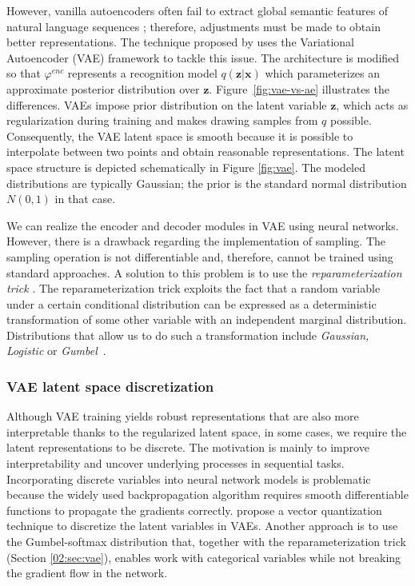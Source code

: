 However, vanilla autoencoders often fail to extract global semantic features of natural language sequences \cite{bowman2015generating}; therefore, adjustments must be made to obtain better representations.
The technique proposed by \citet{kingma2013auto} uses the Variational Autoencoder (VAE) framework to tackle this issue.
The architecture is modified so that $\varphi^{enc}$ represents a recognition model $q(\mathbf{z}|\mathbf{x})$ which parameterizes an approximate posterior distribution over $\mathbf{z}$.
Figure~\ref{fig:vae-vs-ae} illustrates the differences.
VAEs impose prior distribution on the latent variable $\mathbf{z}$, which acts as regularization during training and makes drawing samples from $q$ possible.
Consequently, the VAE latent space is smooth because it is possible to interpolate between two points and obtain reasonable representations.
The latent space structure is depicted schematically in Figure \ref{fig:vae}.
The modeled distributions are typically Gaussian; the prior is the standard normal distribution $N(0, 1)$ in that case.

We can realize the encoder and decoder modules in VAE using neural networks.
However, there is a drawback regarding the implementation of sampling.
The sampling operation is not differentiable and, therefore, cannot be trained using standard approaches.
A solution to this problem is to use the \textit{reparameterization trick} \cite{kingma2013auto}.
The reparameterization trick exploits the fact that a random variable under a certain conditional distribution can be expressed as a deterministic transformation of some other variable with an independent marginal distribution.
Distributions that allow us to do such a transformation include \textit{Gaussian, Logistic} or \textit{Gumbel}~\cite{jang2016categorical}.

\subsubsection{VAE latent space discretization}
\label{02:sec:vae_discrete}
Although VAE training yields robust representations that are also more interpretable thanks to the regularized latent space, in some cases, we require the latent representations to be discrete.
The motivation is mainly to improve interpretability and uncover underlying processes in sequential tasks.
Incorporating discrete variables into neural network models is problematic because the widely used backpropagation algorithm requires smooth differentiable functions to propagate the gradients correctly.
\cite{van2017neural} propose a vector quantization technique to discretize the latent variables in VAEs.
Another approach is to use the Gumbel-softmax distribution \cite{jang2016categorical} that, together with the reparameterization trick (Section \ref{02:sec:vae}), enables work with categorical variables while not breaking the gradient flow in the network.

